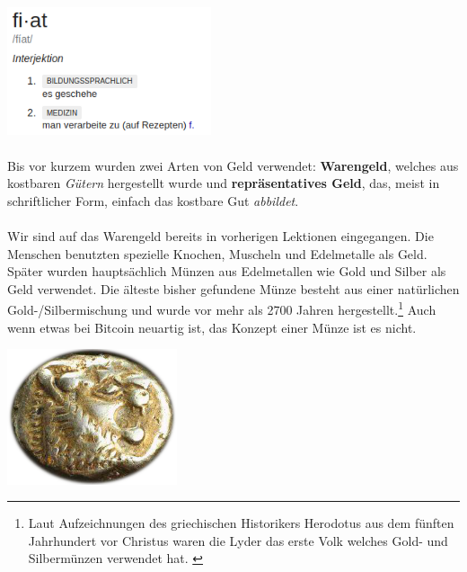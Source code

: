 \begin{center}
  \centering
  \includegraphics[width=6cm]{assets/images/fiat-definition-de.png}
  \label{fig:fiat-definition}
\end{center}

\paragraph{}
Bis vor kurzem wurden zwei Arten von Geld verwendet: \textbf{Warengeld}, welches
aus kostbaren \textit{Gütern} hergestellt wurde und \textbf{repräsentatives
Geld}, das, meist in schriftlicher Form, einfach das kostbare Gut
\textit{abbildet}.

\paragraph{}
Wir sind auf das Warengeld bereits in vorherigen Lektionen eingegangen. Die
Menschen benutzten spezielle Knochen, Muscheln und Edelmetalle als Geld. Später
wurden hauptsächlich Münzen aus Edelmetallen wie Gold und Silber als Geld
verwendet. Die älteste bisher gefundene Münze besteht aus einer natürlichen
Gold-/Silbermischung und wurde vor mehr als 2700 Jahren hergestellt.\footnote{
Laut Aufzeichnungen des griechischen Historikers Herodotus aus dem fünften
Jahrhundert vor Christus waren die Lyder das erste Volk welches Gold- und
Silbermünzen verwendet hat. \cite{coinage-origins}} Auch wenn etwas bei Bitcoin
neuartig ist, das Konzept einer Münze ist es nicht.

\begin{center}
  \centering
  \includegraphics[width=5cm]{assets/images/lydian-coin-stater.png}
  \label{fig:lydian-coin-stater}
\end{center}

